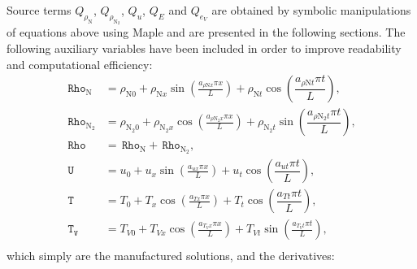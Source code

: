 \documentclass[10pt]{article}
\newcommand{\Rho}{\,\mathtt{Rho}}
\newcommand{\T}{\,\mathtt{T}}
\newcommand{\U}{\,\mathtt{U}}
\newcommand{\TV}{\,\mathtt{T_V}}
\begin{document}
Source terms $ Q_{\rho_{\text{N}}}$, $ Q_{\rho_{\text{N}_2}}$, $Q_u$,  $Q_{E}$ and $Q_{e_V}$ are obtained by symbolic manipulations of equations above using Maple and are presented in the following sections. The following auxiliary variables have been included in order to improve readability and computational efficiency:
\begin{equation}
 \begin{split}
\label{eq:aux_1d}
\Rho_{\text{N}} &= \rho_{\text{N}0} + \rho_{\text{N}x} \sin\left(\frac{a_{  \rho \text{N} x }\pi x}{L}\right)+\rho_{\text{N}t} \cos\left( \dfrac{ a_{ \rho \text{N} t}  \pi t}{L}\right),\\
\Rho_{\text{N}_2} &= \rho_{\text{N}_2 0}+ \rho_{\text{N}_2 x} \cos\left(\frac{a_{ \rho \text{N}_2 x } \pi x}{L}\right)+\rho_{\text{N}_2 t} \sin\left( \dfrac{ a_{ \rho \text{N}_2 t}\pi t}{L}\right),\\
\Rho&=\Rho_{\text{N}}+\Rho_{\text{N}_2},\\
\U &=  u_{0}+u_{x} \sin\left(\frac{a_{u x} \pi x}{L}\right)+ u_t \cos\left( \dfrac{ a_{ut}\pi t}{L}\right),\\
\T &=  T_{0}+T_{x} \cos\left(\frac{a_{T x} \pi x}{L}\right)+ T_t \cos\left( \dfrac{ a_{Tt} \pi t}{L}\right),\\
\TV &=T_{V0}+T_{Vx} \cos\left(\frac{a_{T_V x} \pi x}{L}\right)+T_{Vt}\sin\left(\frac{a_{T_V t} \pi t}{L}\right),\\
\end{split}
\end{equation}
%
which simply are the manufactured solutions, and the derivatives:
\end{document}
